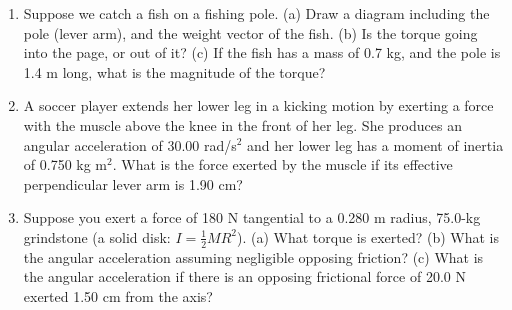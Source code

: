 \documentclass[10pt]{article}
\begin{document}
\begin{enumerate}
\item Suppose we catch a fish on a fishing pole.  (a) Draw a diagram including the pole (lever arm), and the weight vector of the fish.  (b) Is the torque going into the page, or out of it?  (c) If the fish has a mass of 0.7 kg, and the pole is 1.4 m long, what is the magnitude of the torque? \\ \vspace{1.5cm}
\item  A soccer player extends her lower leg in a kicking motion by exerting a force with the muscle above the knee in the front of her leg. She produces an angular acceleration of  30.00 rad/s$^2$ and her lower leg has a moment of inertia of 0.750 kg m$^2$. What is the force exerted by the muscle if its effective perpendicular lever arm is 1.90 cm? \\ \vspace{1cm}
\item Suppose you exert a force of 180 N tangential to a 0.280 m radius, 75.0-kg grindstone (a solid disk: $I = \frac{1}{2}MR^2$).  (a) What torque is exerted? (b) What is the angular acceleration assuming negligible opposing friction? (c) What is the angular acceleration if there is an opposing frictional force of 20.0 N exerted 1.50 cm from the axis? \\ \vspace{2cm}
\end{enumerate}
\end{document}
